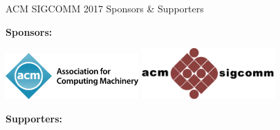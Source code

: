 \documentclass[sigconf]{acmart}
\begin{document}
\onecolumn
\thispagestyle{empty}
\pagestyle{empty}

\begin{center}
{\huge ACM SIGCOMM 2017 Sponsors \& Supporters}
\end{center}

\vspace{.10in}

\setlength\parindent{0pt}

\textbf{\large Sponsors:}

\begin{center}
  \includegraphics[width=2in]{acm.png}
  \hspace{1in}
  \includegraphics[width=2in]{sig.png}
\end{center}

\textbf{\large Supporters:}
\end{document}
